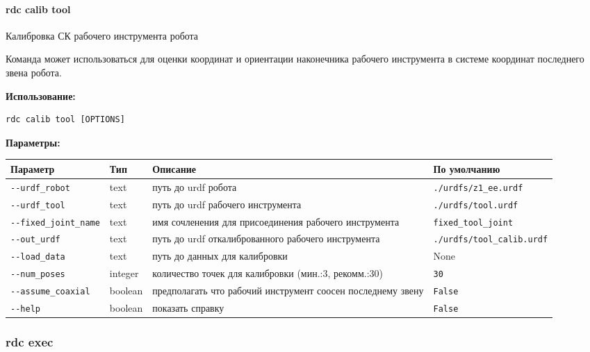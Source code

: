 \hypertarget{rdc-calib-tool}{%
\paragraph{rdc calib tool}\label{rdc-calib-tool}}

Калибровка СК рабочего инструмента робота

Команда может использоваться для оценки координат и ориентации наконечника рабочего инструмента в системе координат последнего звена робота.

\textbf{Использование:}
\begin{lstlisting}[language=python, numbers=none, frame=single]
rdc calib tool [OPTIONS]
\end{lstlisting}

\textbf{Параметры:}
\begin{center}
\fontsize{10pt}{10pt}\selectfont
\begin{longtable}[]{p{4.5cm}|p{2cm}|p{4.0cm}|p{5.2cm}}
    \hline
\toprule()
Параметр & Тип & Описание & По умолчанию \\
\hline
\midrule()
\endhead
\texttt{-\/-urdf\_robot} & text & путь до urdf робота &
\texttt{./urdfs/z1\_ee.urdf} \\
\texttt{-\/-urdf\_tool} & text & путь до urdf рабочего инструмента &
\texttt{./urdfs/tool.urdf} \\
\texttt{-\/-fixed\_joint\_name} & text & имя сочленения для присоединения рабочего инструмента &
\texttt{fixed\_tool\_joint} \\
\texttt{-\/-out\_urdf} & text & путь до urdf откалиброванного рабочего инструмента &
\texttt{./urdfs/tool\_calib.urdf} \\
\texttt{-\/-load\_data} & text & путь до данных для калибровки & None \\
\texttt{-\/-num\_poses} & integer & количество  точек для калибровки
(мин.:3, рекомм.:30) & \texttt{30} \\
\texttt{-\/-assume\_coaxial} & boolean & предполагать что рабочий инструмент соосен последнему звену & \texttt{False} \\
\texttt{-\/-help} & boolean & показать справку &
\texttt{False} \\
\bottomrule()
\hline
\end{longtable}
\end{center}

\hypertarget{rdc-exec}{%
\subsubsection{rdc exec}\label{rdc-exec}}

